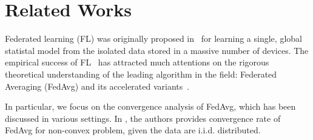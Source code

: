 
\section{Related Works}

Federated learning (FL) was originally proposed
in~\cite{mcmahan2016communication} for learning a single, global statistal
model from the isolated data stored in a massive number of devices.  The
empirical success of FL~\cite{chen2018federated,47586} has attracted much
attentions on the rigorous theoretical understanding of the leading algorithm 
in the field: Federated Averaging (FedAvg) and its accelerated variants~\cite{liu2019accelerating,haddadpour2019convergence,khaled2019first,li2019convergence,huo2020faster,yu2019linear,yu2019parallel,koloskova2020unified}.

In particular, we focus on the convergence analysis of FedAvg, which
has been discussed in various settings. 
In \cite{yu2019parallel,wang2019adaptive}, the authors provides convergence
rate of FedAvg for non-convex problem, given the data are i.i.d. distributed.







